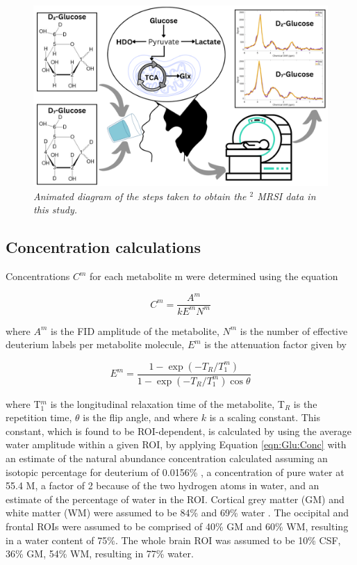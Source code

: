 \documentclass[class=article, crop=false]{standalone}
\begin{document}
\begin{figure}
    \centering
    \includegraphics[width = 1\textwidth]{Figures/Glucose/Study_Day.png}
    \caption{\textit{Animated diagram of the steps taken to obtain the $^2$ MRSI data in this study.}}
    \label{fig:Glu:Study_Day}
\end{figure}

\subsection{Concentration calculations}

Concentrations $C^m$ for each metabolite m were determined using the equation

\begin{equation}
    C^m = \frac{A^m}{kE^mN^m}
    \label{eqn:Glu:Conc}
\end{equation}

where $A^m$ is the FID amplitude of the metabolite, $N^m$ is the number of effective deuterium labels per metabolite molecule, $E^m$ is the attenuation factor given by

\begin{equation}
    E^m = \frac{1-\exp(-T_R/T_1^m)}{1-\exp(-T_R/T_1^m)\cos{\theta}}
    \label{eqn:Glu:Atte}
\end{equation}

where T$_1^m$ is the longitudinal relaxation time of the metabolite, T$_R$ is the repetition time, $\theta$ is the flip angle, and where $k$ is a scaling constant. This constant, which is found to be ROI-dependent, is calculated by using the average water amplitude within a given ROI, by applying Equation \ref{eqn:Glu:Conc} with an estimate of the natural abundance concentration calculated assuming an isotopic percentage for deuterium of 0.0156\% \cite{Hagemann1970AbsoluteSMOW}, a concentration of pure water at 55.4 M, a factor of 2 because of the two hydrogen atoms in water, and an estimate of the percentage of water in the ROI. Cortical grey matter (GM) and white matter (WM) were assumed to be 84\% and 69\% water \cite{Oros-Peusquens2019AImplications}. The occipital and frontal ROIs were assumed to be comprised of 40\% GM and 60\% WM, resulting in a water content of 75\%. The whole brain ROI was assumed to be 10\% CSF, 36\% GM, 54\% WM, resulting in 77\% water.
\end{document}
